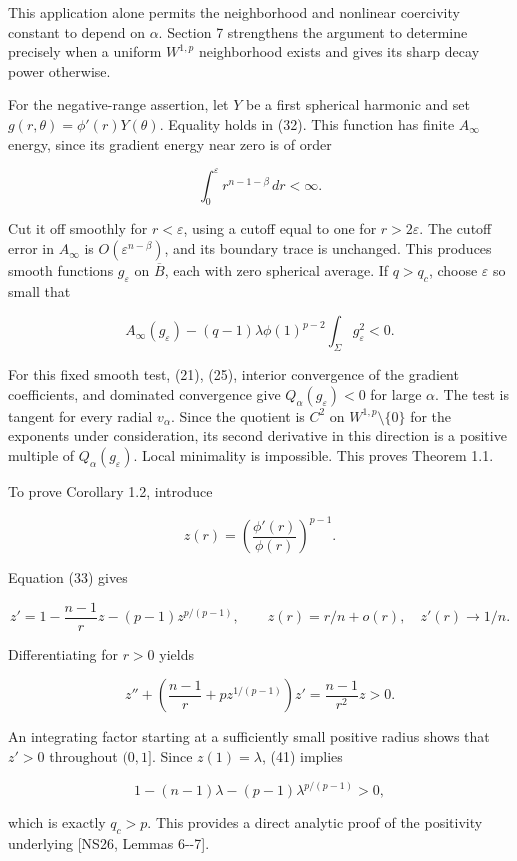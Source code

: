 \documentclass[11pt]{article}
\begin{document}
This application alone permits the neighborhood and nonlinear coercivity
constant to depend on \(\alpha\). Section 7 strengthens the argument to
determine precisely when a uniform \(W^{1,p}\) neighborhood exists and
gives its sharp decay power otherwise.

For the negative-range assertion, let \(Y\) be a first spherical
harmonic and set \(g(r,\theta)=\phi'(r)Y(\theta)\). Equality holds in
(32). This function has finite \(A_\infty\) energy, since its gradient
energy near zero is of order

\[
\int_0^\varepsilon r^{n-1-\beta}\,dr<\infty.
\]

Cut it off smoothly for \(r<\varepsilon\), using a cutoff equal to one
for \(r>2\varepsilon\). The cutoff error in \(A_\infty\) is
\(O(\varepsilon^{n-\beta})\), and its boundary trace is unchanged. This
produces smooth functions \(g_\varepsilon\) on \(\overline B\), each
with zero spherical average. If \(q>q_c\), choose \(\varepsilon\) so
small that

\[
A_\infty(g_\varepsilon)
 -(q-1)\lambda\phi(1)^{p-2}\int_\Sigma g_\varepsilon^2<0.
\tag{40}
\]

For this fixed smooth test, (21), (25), interior convergence of the
gradient coefficients, and dominated convergence give
\(Q_\alpha(g_\varepsilon)<0\) for large \(\alpha\). The test is tangent
for every radial \(v_\alpha\). Since the quotient is \(C^2\) on
\(W^{1,p}\setminus\{0\}\) for the exponents under consideration, its
second derivative in this direction is a positive multiple of
\(Q_\alpha(g_\varepsilon)\). Local minimality is impossible. This proves
Theorem 1.1.

To prove Corollary 1.2, introduce

\[
z(r)=\left(\frac{\phi'(r)}{\phi(r)}\right)^{p-1}.
\]

Equation (33) gives

\[
z'=1-\frac{n-1}{r}z-(p-1)z^{p/(p-1)},\qquad
z(r)=r/n+o(r),\quad z'(r)\to1/n.
\tag{41}
\]

Differentiating for \(r>0\) yields

\[
z''+\left(\frac{n-1}{r}+p z^{1/(p-1)}\right)z'
 =\frac{n-1}{r^2}z>0.
\tag{42}
\]

An integrating factor starting at a sufficiently small positive radius
shows that \(z'>0\) throughout \((0,1]\). Since \(z(1)=\lambda\), (41)
implies

\[
1-(n-1)\lambda-(p-1)\lambda^{p/(p-1)}>0,
\]

which is exactly \(q_c>p\). This provides a direct analytic proof of the
positivity underlying {[}NS26, Lemmas 6-\/-7{]}.
\end{document}
